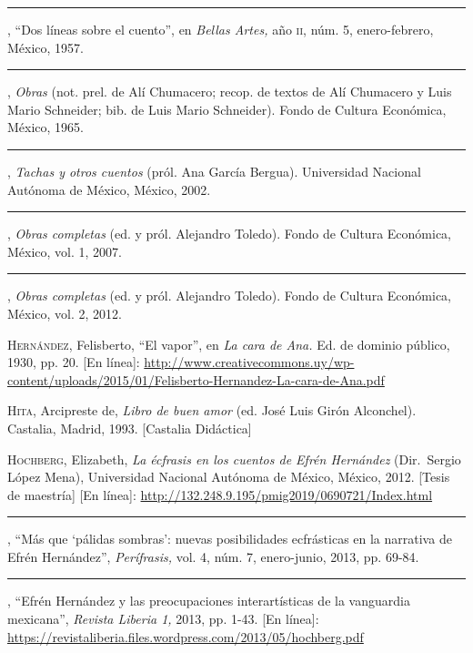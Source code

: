 \documentclass[14pt,twoside,final]{extbook} %
\begin{document}
\rule{1cm}{0.4pt}, ``Dos líneas sobre el cuento'', en \emph{Bellas Artes,} año \textsc{ii}, núm. 5, enero-febrero, México, 1957.\label{bib:hernandez1957}

\rule{1cm}{0.4pt}, \emph{Obras} (not. prel. de Alí Chumacero; recop. de textos de Alí Chumacero y Luis Mario Schneider; bib. de Luis Mario Schneider). Fondo de Cultura Económica, México, 1965.\label{bib:hernandez1965}

\rule{1cm}{0.4pt}, \emph{Tachas y otros cuentos} (pról. Ana García Bergua). Universidad Nacional Autónoma de México, México, 2002.\label{bib:hernandez2002}

\rule{1cm}{0.4pt}, \emph{Obras completas} (ed. y pról. Alejandro Toledo). Fondo de Cultura Económica, México, vol. 1, 2007.\label{bib:hernandez2007}

\rule{1cm}{0.4pt}, \emph{Obras completas} (ed. y pról. Alejandro Toledo). Fondo de Cultura Económica, México, vol. 2, 2012.\label{bib:hernandez2012}

\textsc{Hernández}, Felisberto, ``El vapor'', en \emph{La cara de Ana.} Ed. de dominio público, 1930, pp. 20. [En línea]: \href{http://www.creativecommons.uy/wp-content/uploads/2015/01/Felisberto-Hernandez-La-cara-de-Ana.pdf}{http://www.creativecommons.uy/wp-content/uploads/2015/01/Felisberto-Hernandez-La-cara-de-Ana.pdf}\label{fhernandez1930}

\textsc{Hita}, Arcipreste de, \emph{Libro de buen amor} (ed. José Luis Girón Alconchel). Castalia, Madrid, 1993. [Castalia Didáctica]\label{bib:hita1993}

\textsc{Hochberg}, Elizabeth, \emph{La écfrasis en los cuentos de Efrén Hernández} (Dir.~Sergio López Mena), Universidad Nacional Autónoma de México, México, 2012. [Tesis de maestría] [En línea]: \url{http://132.248.9.195/pmig2019/0690721/Index.html}\label{bib:hochberg2012}

\rule{1cm}{0.4pt}, ``Más que `pálidas sombras': nuevas posibilidades ecfrásticas en la narrativa de Efrén Hernández'', \emph{Perífrasis,} vol. 4, núm. 7, enero-junio, 2013, pp. 69-84.\label{bib:hochberg2013a}

\rule{1cm}{0.4pt}, ``Efrén Hernández y las preocupaciones interartísticas de la vanguardia mexicana'', \emph{Revista Liberia 1,} 2013, pp. 1-43. [En línea]: \url{https://revistaliberia.files.wordpress.com/2013/05/hochberg.pdf}\label{bib:hochberg2013b}
\end{document}
